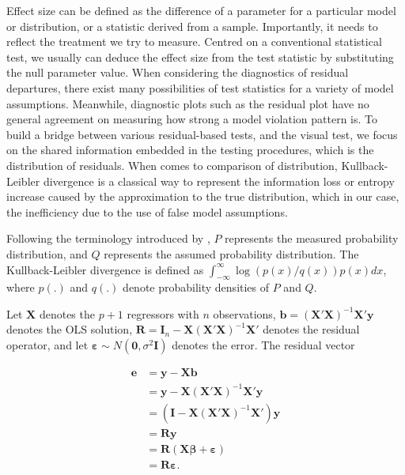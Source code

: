 \documentclass[]{interact}
\theoremstyle{plain}%
\theoremstyle{definition}
\theoremstyle{remark}
\begin{document}
Effect size can be defined as the difference of a parameter for a
particular model or distribution, or a statistic derived from a sample.
Importantly, it needs to reflect the treatment we try to measure.
Centred on a conventional statistical test, we usually can deduce the
effect size from the test statistic by substituting the null parameter
value. When considering the diagnostics of residual departures, there
exist many possibilities of test statistics for a variety of model
assumptions. Meanwhile, diagnostic plots such as the residual plot have
no general agreement on measuring how strong a model violation pattern
is. To build a bridge between various residual-based tests, and the
visual test, we focus on the shared information embedded in the testing
procedures, which is the distribution of residuals. When comes to
comparison of distribution, Kullback-Leibler divergence
\citep{kullback1951information} is a classical way to represent the
information loss or entropy increase caused by the approximation to the
true distribution, which in our case, the inefficiency due to the use of
false model assumptions.

Following the terminology introduced by \citet{kullback1951information},
\(P\) represents the measured probability distribution, and \(Q\)
represents the assumed probability distribution. The Kullback-Leibler
divergence is defined as
\(\int_{-\infty}^{\infty}\log(p(x)/q(x))p(x)dx\), where \(p(.)\) and
\(q(.)\) denote probability densities of \(P\) and \(Q\).

Let \(\boldsymbol{X}\) denotes the \(p + 1\) regressors with \(n\)
observations,
\(\boldsymbol{b} = (\boldsymbol{X}'\boldsymbol{X})^{-1}\boldsymbol{X}'\boldsymbol{y}\)
denotes the OLS solution,
\(\boldsymbol{R} = \boldsymbol{I}_n -\boldsymbol{X}(\boldsymbol{X}'\boldsymbol{X})^{-1}\boldsymbol{X}'\)
denotes the residual operator, and let
\(\boldsymbol{\varepsilon} \sim N(\boldsymbol{0},\sigma^2\boldsymbol{I})\)
denotes the error. The residual vector

\begin{align*}
\boldsymbol{e} &= \boldsymbol{y} - \boldsymbol{X}\boldsymbol{b} \\
               &= \boldsymbol{y} - \boldsymbol{X}(\boldsymbol{X}'\boldsymbol{X})^{-1}\boldsymbol{X}'\boldsymbol{y} \\
               &= (\boldsymbol{I} -\boldsymbol{X}(\boldsymbol{X}'\boldsymbol{X})^{-1}\boldsymbol{X}')\boldsymbol{y} \\
               &= \boldsymbol{R}\boldsymbol{y} \\
               &= \boldsymbol{R}(\boldsymbol{X}\boldsymbol{\beta} + \boldsymbol{\varepsilon}) \\
               &= \boldsymbol{R}\boldsymbol{\varepsilon}.
\end{align*}
\end{document}
